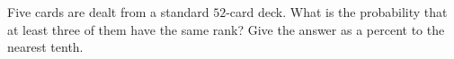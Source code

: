 Five cards are dealt from a standard $52$-card deck. What is the probability that at least three of them have the same rank? Give the answer as a percent to the nearest tenth.
